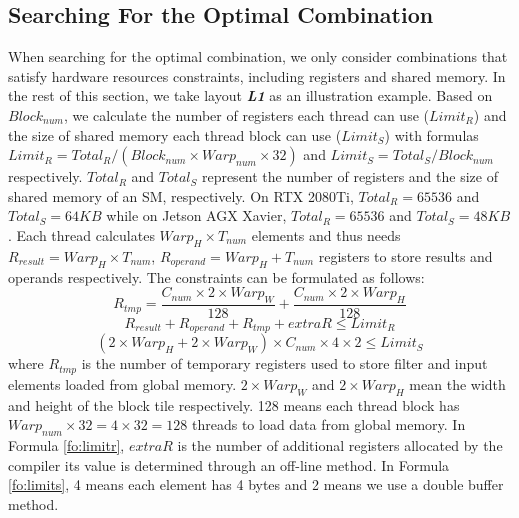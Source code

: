 \subsection{Searching For the Optimal Combination}
When searching for the optimal combination, we only consider combinations that satisfy hardware resources constraints, including registers and shared memory.
In the rest of this section, we take layout \textbf{\emph{L1}} as an illustration example.
Based on $Block_{num}$, we calculate the number of registers each thread can use ($Limit_R$) and the size of shared memory each thread block can use ($Limit_S$) with formulas $Limit_R=Total_R/(Block_{num}\times Warp_{num} \times 32)$ and $Limit_S=Total_S/Block_{num}$ respectively. $Total_R$ and $Total_S$ represent the number of registers and the size of shared memory of an SM, respectively. On RTX 2080Ti, $Total_R=65536$ and $Total_S=64KB$ while  on Jetson AGX Xavier, $Total_R=65536$ and $Total_S=48KB$.
Each thread calculates $Warp_H \times T_{num}$ elements and thus needs $R_{result}=Warp_H \times T_{num}$, $R_{operand}=Warp_H+T_{num}$ registers to store results and operands respectively.
The constraints can be formulated as follows:
\begin{equation}\nonumber
R_{tmp}=\frac{C_{num} \times 2 \times Warp_W}{128}+\frac{C_{num}  \times 2 \times Warp_H}{128}
\end{equation}
\begin{equation}
    \label{fo:limitr}
R_{result}+R_{operand}+R_{tmp}+extraR \leq Limit_R
\end{equation}
\begin{equation}
    \label{fo:limits}
(2 \times Warp_H+2 \times Warp_W)\times C_{num} \times 4 \times 2 \leq Limit_S
\end{equation}
where $R_{tmp}$ is the number of temporary registers used to store filter and input elements loaded from global memory.
$2 \times Warp_W$ and $2 \times Warp_H$ mean the width and height of the block tile respectively. 128 means each thread block has $Warp_{num} \times 32 = 4 \times 32=128$ threads to load data from global memory. 
In Formula \ref{fo:limitr}, $extraR$ is the number of additional registers allocated by the compiler its value is determined through an off-line method. In Formula \ref{fo:limits}, 4 means each element has 4 bytes and 2 means we use a double buffer method.
